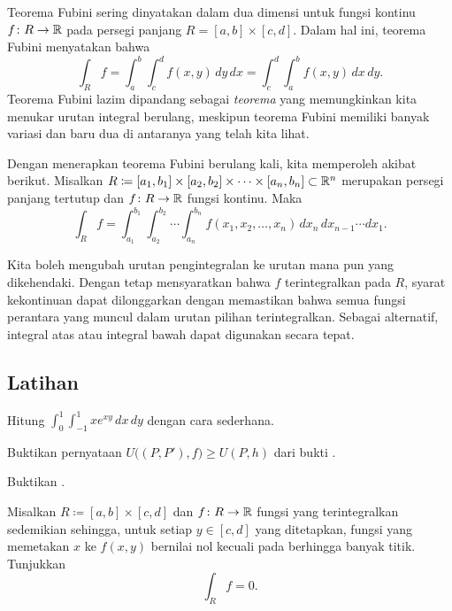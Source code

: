 Teorema Fubini sering dinyatakan dalam dua dimensi untuk fungsi kontinu
$f \colon R \to {\mathbb{R}}$ pada persegi panjang
$R = [a,b] \times [c,d]$. Dalam hal ini, teorema Fubini menyatakan bahwa
\begin{equation*}
\int_R f = \int_a^b \int_c^d f(x,y) \,dy\,dx
=
\int_c^d \int_a^b f(x,y) \,dx\,dy .
\end{equation*}
Teorema Fubini lazim dipandang sebagai \emph{teorema} yang memungkinkan kita
menukar urutan integral berulang, meskipun teorema Fubini memiliki banyak
variasi dan baru dua di antaranya yang telah kita lihat.

Dengan menerapkan teorema Fubini berulang kali, kita memperoleh akibat berikut.
Misalkan $R \coloneqq [a_1,b_1] \times [a_2,b_2] \times \cdots \times [a_n,b_n]
\subset {\mathbb{R}}^n$ merupakan persegi panjang tertutup dan
$f \colon R \to {\mathbb{R}}$ fungsi kontinu. Maka
\begin{equation*}
\int_R f = 
\int_{a_1}^{b_1}
\int_{a_2}^{b_2}
\cdots
\int_{a_n}^{b_n}
f(x_1,x_2,\ldots,x_n)
\,
dx_n
\,
dx_{n-1}
\cdots
dx_1 .
\end{equation*}

Kita boleh mengubah urutan pengintegralan ke urutan mana pun yang dikehendaki.
Dengan tetap mensyaratkan bahwa $f$ terintegralkan pada $R$, syarat kekontinuan
dapat dilonggarkan dengan memastikan bahwa semua fungsi perantara yang muncul
dalam urutan pilihan terintegralkan. Sebagai alternatif, integral atas atau
integral bawah dapat digunakan secara tepat.

\subsection{Latihan}

\begin{exercise}
Hitung $\int_{0}^1 \int_{-1}^1 xe^{xy} \, dx \, dy$ dengan cara sederhana.
\end{exercise}

\begin{exercise}
Buktikan pernyataan $U\bigl((P,P'),f\bigr) \geq U(P,h)$ dari bukti
.
\end{exercise}

\begin{exercise}[Mudah]
Buktikan .
\end{exercise}

\begin{exercise}
Misalkan $R \coloneqq [a,b] \times [c,d]$ dan
$f \colon R \to {\mathbb{R}}$ fungsi yang terintegralkan sedemikian sehingga, untuk
setiap $y \in [c,d]$ yang ditetapkan, fungsi yang memetakan $x$ ke $f(x,y)$
bernilai nol kecuali pada berhingga banyak titik. Tunjukkan
\begin{equation*}
\int_R f = 0 .
\end{equation*}
\end{exercise}

